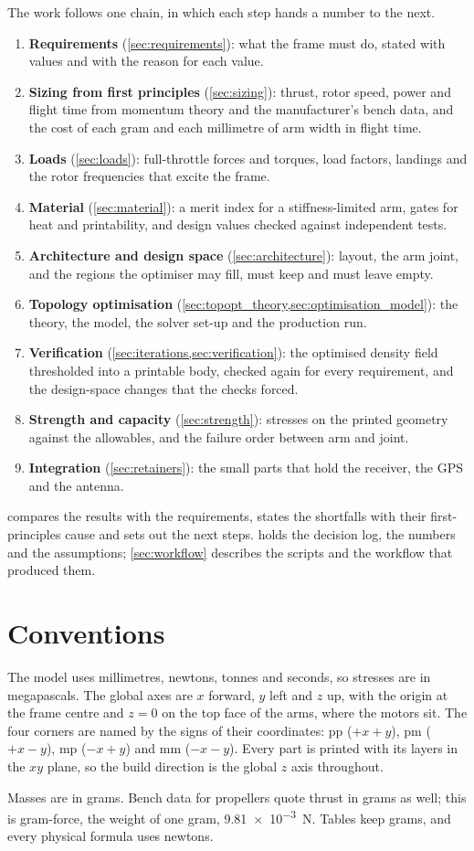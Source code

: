 The work follows one chain, in which each step hands a number to the next.
\begin{enumerate}
\item \textbf{Requirements} (\cref{sec:requirements}): what the frame must do, stated with values and with the reason for each value.
\item \textbf{Sizing from first principles} (\cref{sec:sizing}): thrust, rotor speed, power and flight time from momentum theory and the manufacturer's bench data, and the cost of each gram and each millimetre of arm width in flight time.
\item \textbf{Loads} (\cref{sec:loads}): full-throttle forces and torques, load factors, landings and the rotor frequencies that excite the frame.
\item \textbf{Material} (\cref{sec:material}): a merit index for a stiffness-limited arm, gates for heat and printability, and design values checked against independent tests.
\item \textbf{Architecture and design space} (\cref{sec:architecture}): layout, the arm joint, and the regions the optimiser may fill, must keep and must leave empty.
\item \textbf{Topology optimisation} (\cref{sec:topopt_theory,sec:optimisation_model}): the theory, the model, the solver set-up and the production run.
\item \textbf{Verification} (\cref{sec:iterations,sec:verification}): the optimised density field thresholded into a printable body, checked again for every requirement, and the design-space changes that the checks forced.
\item \textbf{Strength and capacity} (\cref{sec:strength}): stresses on the printed geometry against the allowables, and the failure order between arm and joint.
\item \textbf{Integration} (\cref{sec:retainers}): the small parts that hold the receiver, the GPS and the antenna.
\end{enumerate}
 compares the results with the requirements, states the shortfalls with their first-principles cause and sets out the next steps.  holds the decision log, the numbers and the assumptions; \cref{sec:workflow} describes the scripts and the workflow that produced them.

\section{Conventions}\label{sec:intro-conventions}

The model uses millimetres, newtons, tonnes and seconds, so stresses are in megapascals. The global axes are $x$ forward, $y$ left and $z$ up, with the origin at the frame centre and $z = 0$ on the top face of the arms, where the motors sit. The four corners are named by the signs of their coordinates: pp ($+x+y$), pm ($+x-y$), mp ($-x+y$) and mm ($-x-y$). Every part is printed with its layers in the $xy$ plane, so the build direction is the global $z$ axis throughout.

Masses are in grams. Bench data for propellers quote thrust in grams as well; this is gram-force, the weight of one gram, \SI{9.81e-3}{N}. Tables keep grams, and every physical formula uses newtons.
